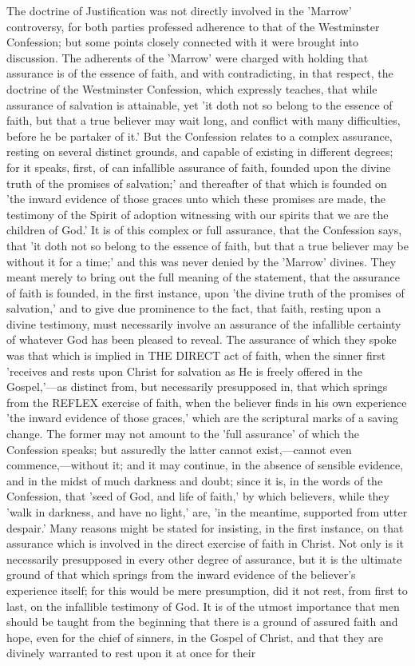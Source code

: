 \documentclass[
]{book}
\begin{document}
The doctrine of Justification was not directly involved in the 'Marrow' controversy, for both parties professed adherence to that of the Westminster Confession; but some points closely connected with it were brought into discussion. The adherents of the 'Marrow' were charged with holding that assurance is of the essence of faith, and with contradicting, in that respect, the doctrine of the Westminster Confession, which expressly teaches, that while assurance of salvation is attainable, yet 'it doth not so belong to the essence of faith, but that a true believer may wait long, and conflict with many difficulties, before he be partaker of it.' But the Confession relates to a complex assurance, resting on several distinct grounds, and capable of existing in different degrees; for it speaks, first, of can infallible assurance of faith, founded upon the divine truth of the promises of salvation;' and thereafter of that which is founded on 'the inward evidence of those graces unto which these promises are made, the testimony of the Spirit of adoption witnessing with our spirits that we are the children of God.' It is of this complex or full assurance, that the Confession says, that 'it doth not so belong to the essence of faith, but that a true believer may be without it for a time;' and this was never denied by the 'Marrow' divines. They meant merely to bring out the full meaning of the statement, that the assurance of faith is founded, in the first instance, upon 'the divine truth of the promises of salvation,' and to give due prominence to the fact, that faith, resting upon a divine testimony, must necessarily involve an assurance of the infallible certainty of whatever God has been pleased to reveal. The assurance of which they spoke was that which is implied in THE DIRECT act of faith, when the sinner first 'receives and rests upon Christ for salvation as He is freely offered in the Gospel,'---as distinct from, but necessarily presupposed in, that which springs from the REFLEX exercise of faith, when the believer finds in his own experience 'the inward evidence of those graces,' which are the scriptural marks of a saving change. The former may not amount to the 'full assurance' of which the Confession speaks; but assuredly the latter cannot exist,---cannot even commence,---without it; and it may continue, in the absence of sensible evidence, and in the midst of much darkness and doubt; since it is, in the words of the Confession, that 'seed of God, and life of faith,' by which believers, while they 'walk in darkness, and have no light,' are, 'in the meantime, supported from utter despair.' Many reasons might be stated for insisting, in the first instance, on that assurance which is involved in the direct exercise of faith in Christ. Not only is it necessarily presupposed in every other degree of assurance, but it is the ultimate ground of that which springs from the inward evidence of the believer's experience itself; for this would be mere presumption, did it not rest, from first to last, on the infallible testimony of God. It is of the utmost importance that men should be taught from the beginning that there is a ground of assured faith and hope, even for the chief of sinners, in the Gospel of Christ, and that they are divinely warranted to rest upon it at once for their 
\end{document}
